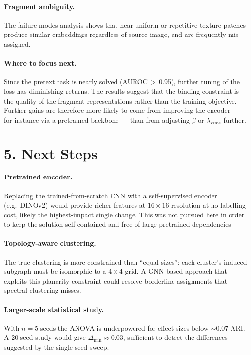 \documentclass[10pt, a4paper, twocolumn]{article}
\begin{document}
\paragraph{Fragment ambiguity.}
The failure-modes analysis shows that near-uniform or repetitive-texture
patches produce similar embeddings regardless of source image, and are
frequently mis-assigned.

\paragraph{Where to focus next.}
Since the pretext task is nearly solved (AUROC\,$>$\,0.95), further tuning
of the loss has diminishing returns. The results suggest that the binding
constraint is the quality of the fragment representations rather than the
training objective. Further gains are therefore more likely to come from
improving the encoder --- for instance via a pretrained backbone --- than
from adjusting $\beta$ or $\lambda_{\text{same}}$ further.

\section*{5. Next Steps}

\paragraph{Pretrained encoder.}
Replacing the trained-from-scratch CNN with a self-supervised encoder
(e.g.\ DINOv2) would provide richer features at $16{\times}16$ resolution
at no labelling cost, likely the highest-impact single change. This was not
pursued here in order to keep the solution self-contained and free of large
pretrained dependencies.

\paragraph{Topology-aware clustering.}
The true clustering is more constrained than ``equal sizes'': each cluster's
induced subgraph must be isomorphic to a $4{\times}4$ grid. A GNN-based
approach that exploits this planarity constraint could resolve borderline
assignments that spectral clustering misses.

\paragraph{Larger-scale statistical study.}
With $n=5$ seeds the ANOVA is underpowered for effect sizes below
$\sim\!0.07$ ARI. A 20-seed study would give $\Delta_{\min}\approx0.03$,
sufficient to detect the differences suggested by the single-seed sweep.
\end{document}
